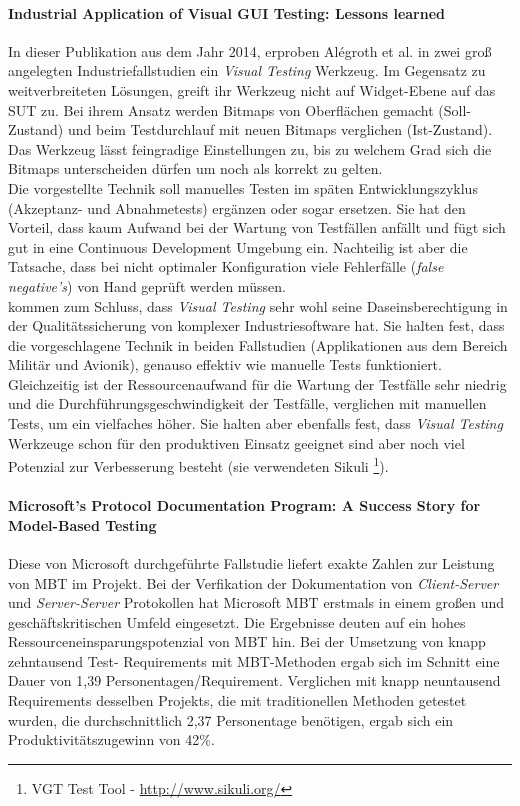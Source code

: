 \paragraph{Industrial Application of Visual GUI Testing: Lessons learned \cite{alegroth_industrial_2014}}In dieser Publikation aus dem Jahr 2014, erproben Alégroth et al. in zwei groß angelegten Industriefallstudien ein \textit{Visual Testing} Werkzeug. Im Gegensatz zu weitverbreiteten Lösungen, greift ihr Werkzeug nicht auf Widget-Ebene auf das \Gls{SUT} zu. Bei ihrem Ansatz werden Bitmaps von Oberflächen gemacht (Soll-Zustand) und beim Testdurchlauf mit neuen Bitmaps verglichen (Ist-Zustand). Das Werkzeug lässt feingradige Einstellungen zu, bis zu welchem Grad sich die Bitmaps unterscheiden dürfen um noch als korrekt zu gelten.\\
Die vorgestellte Technik soll manuelles Testen im späten Entwicklungszyklus (Akzeptanz- und Abnahmetests) ergänzen oder sogar ersetzen. Sie hat den Vorteil, dass kaum Aufwand bei der Wartung von Testfällen anfällt und fügt sich gut in eine Continuous Development Umgebung ein. Nachteilig ist aber die Tatsache, dass bei nicht optimaler Konfiguration viele Fehlerfälle (\textit{false negative's}) von Hand geprüft werden müssen.\\
\citeauthor{alegroth_industrial_2014} kommen zum Schluss, dass \textit{Visual Testing} sehr wohl seine Daseinsberechtigung in der Qualitätssicherung von komplexer Industriesoftware hat. Sie halten fest, dass die vorgeschlagene Technik in beiden Fallstudien (Applikationen aus dem Bereich Militär und Avionik), genauso effektiv wie manuelle Tests funktioniert. Gleichzeitig ist der Ressourcenaufwand für die Wartung der Testfälle sehr niedrig und die Durchführungsgeschwindigkeit der Testfälle, verglichen mit manuellen Tests, um ein vielfaches höher. Sie halten aber ebenfalls fest, dass \textit{Visual Testing} Werkzeuge schon für den produktiven Einsatz geeignet sind aber noch viel Potenzial zur Verbesserung besteht (sie verwendeten Sikuli \footnote{VGT Test Tool - \url{http://www.sikuli.org/}}).

\paragraph{Microsoft’s Protocol Documentation Program: A Success Story for Model-Based Testing\cite{grieskamp_microsofts_2010}}\label{sec:microsoft_fallstudie}
Diese von Microsoft durchgeführte Fallstudie liefert exakte Zahlen zur Leistung von \Gls{MBT} im Projekt. Bei der Verfikation der Dokumentation von \textit{Client-Server} und \textit{Server-Server} Protokollen hat Microsoft \Gls{MBT} erstmals in einem großen und geschäftskritischen Umfeld eingesetzt. Die Ergebnisse deuten auf ein hohes Ressourceneinsparungspotenzial von \Gls{MBT} hin. Bei der Umsetzung von knapp zehntausend Test- Requirements mit MBT-Methoden ergab sich im Schnitt eine Dauer von 1,39 Personentagen/Requirement. Verglichen mit knapp neuntausend Requirements desselben Projekts, die mit traditionellen Methoden getestet wurden, die durchschnittlich 2,37 Personentage benötigen, ergab sich ein Produktivitätszugewinn von 42\%.

